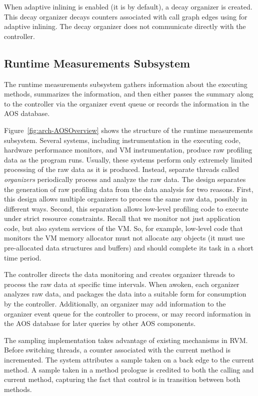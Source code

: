 When adaptive inlining is enabled (it is by default), a decay
organizer is created.  This decay organizer decays counters associated
with call graph edges using for adaptive inlining.  The decay
organizer does not communicate directly with the controller.


\subsection{Runtime Measurements Subsystem}\label{sec:arch:rms}
The runtime measurements subsystem gathers information
about the executing methods, summarizes the information, and then
either passes the summary along to the controller via the organizer
event queue or records the information in the AOS database.

Figure~\ref{fig:arch-AOSOverview} shows the structure of the runtime
measurements subsystem.  
Several systems, including 
instrumentation in the executing
code, 
hardware performance monitors, and VM instrumentation, 
produce
raw profiling data as the program runs.
Usually, these systems perform only extremely limited processing of the
raw data as it is produced.
Instead, separate threads called {\em organizers} periodically 
process and analyze the raw data.
The design separates the generation of raw profiling data from the 
data analysis for two reasons.  First, this design allows
multiple organizers to process the same raw data, possibly in
different ways. Second, this separation allows low-level profiling
code to execute under strict resource constraints.  Recall that
we monitor not just application code, but also system services of the 
VM. So, for example, 
low-level code that monitors the VM memory allocator must not allocate 
any objects (it must use
pre-allocated data structures and buffers) and should complete its
task in a short time period.

The controller directs the data monitoring and creates
organizer threads to process the raw data at specific time
intervals. When awoken, each organizer analyzes raw data, and
packages the data into a suitable form for consumption by the
controller.  Additionally, an organizer may add
information to the organizer event queue for the controller to
process, or may record information in the AOS database for later
queries by other AOS components.

The sampling implementation takes advantage of existing mechanisms in
RVM.  Before switching threads, a counter associated with the current
method is incremented.  The system attributes a sample taken on a back
edge to the current method.  A sample taken in a method prologue is
credited to both the calling and current method, capturing the fact
that control is in transition between both methods. 

